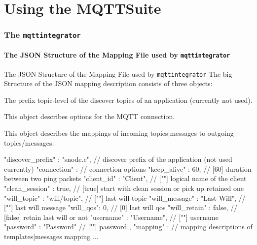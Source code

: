 ﻿\part{Using the MQTTSuite}

\section[withsectionpage]{The \texttt{mqttintegrator}}

\subsection{The \alert{JSON Structure} of the Mapping File used by \alert{\texttt{mqttintegrator}}}

\begin{frame}[fragile]{The \alert{JSON Structure} of the Mapping File used by \alert{\texttt{mqttintegrator}}}
  The big Structure of the JSON mapping description consists of three objects:
  \begin{description}
    \item[discover\_prefix] The prefix topic-level of the discover topics of an application (currently not used).
    \item[connection] This object describes options for the MQTT connection.
    \item[mappings] This object describes the mappings of incoming topics|messages to outgoing topics/messages.
  \end{description}

  \begin{jsoncode}[gobble=4]
    {
        "discover_prefix" : "snode.c",         // discover prefix of the application (not used currently)
        "connection" : {                       // connection options
            "keep_alive" : 60,                 // [60]    duration between two ping packets
            "client_id" : "Client",            // [""]    logical name of the client
            "clean_session" : true,            // [true]  start with clean session or pick up retained one
            "will_topic" : "will/topic",       // [""]    last will topic
            "will_message" : "Last Will",      // [""]    last will message
            "will_qos": 0,                     // [0]     last will qos
            "will_retain" : false,             // [false] retain last will or not
            "username" : "Username",           // [""]    username
            "password" : "Password"            // [""]    password
        },
        "mapping" : {                          // mapping descriptions of templates|messages mapping
            ...
        }
    }
  \end{jsoncode}
\end{frame}


